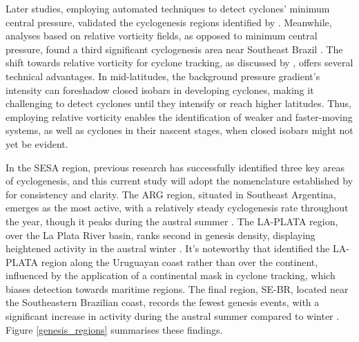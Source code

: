 Later studies, employing automated techniques to detect cyclones' minimum central pressure, validated the cyclogenesis regions identified by \citet{gan1991surface} \citep{simmonds1999southern,simmonds2000mean,mendes2010climatology}. Meanwhile, analyses based on relative vorticity fields, as opposed to minimum central pressure, found a third significant cyclogenesis area near Southeast Brazil \citep{hoskins2005new,sinclair1995climatology,reboita2010south,gramcianinov2019properties}. The shift towards relative vorticity for cyclone tracking, as discussed by \citet{hoskins2002new,sinclair1994objective}, offers several technical advantages. In mid-latitudes, the background pressure gradient's intensity can foreshadow closed isobars in developing cyclones, making it challenging to detect cyclones until they intensify or reach higher latitudes. Thus, employing relative vorticity enables the identification of weaker and faster-moving systems, as well as cyclones in their nascent stages, when closed isobars might not yet be evident.

In the SESA region, previous research has successfully identified three key areas of cyclogenesis, and this current study will adopt the nomenclature established by \citet{gramcianinov2019properties} for consistency and clarity. The ARG region, situated in Southeast Argentina, emerges as the most active, with a relatively steady cyclogenesis rate throughout the year, though it peaks during the austral summer \citep{crespo2021potential,gramcianinov2019properties,reboita2010south}. The LA-PLATA region, over the La Plata River basin, ranks second in genesis density, displaying heightened activity in the austral winter \citep{crespo2021potential,gramcianinov2019properties,reboita2010south}. It's noteworthy that \citet{reboita2010south} identified the LA-PLATA region along the Uruguayan coast rather than over the continent, influenced by the application of a continental mask in cyclone tracking, which biases detection towards maritime regions. The final region, SE-BR, located near the Southeastern Brazilian coast, records the fewest genesis events, with a significant increase in activity during the austral summer compared to winter \citep{reboita2010south,gramcianinov2019properties,crespo2021potential}. Figure \ref{genesis_regions} summarises these findings. 

